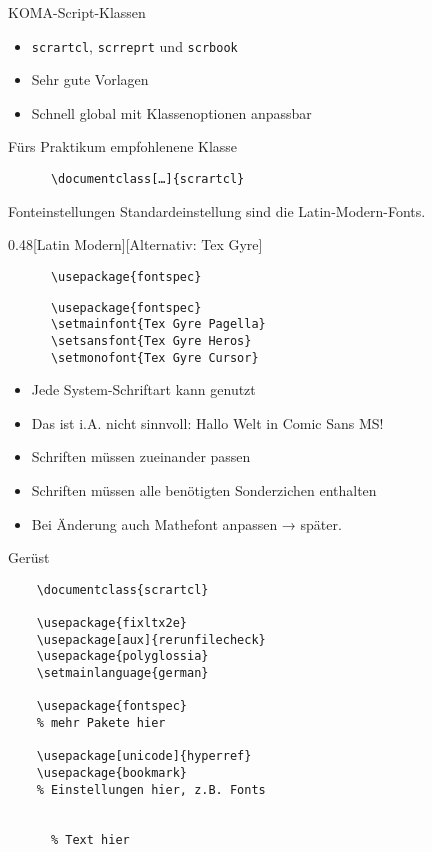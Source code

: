 \begin{frame}[fragile]{
  KOMA-Script-Klassen
  \hfill{}
}
  \begin{itemize}
    \item \texttt{scrartcl}, \texttt{scrreprt} und \texttt{scrbook}
    \item Sehr gute Vorlagen
    \item Schnell global mit Klassenoptionen anpassbar
  \end{itemize}
  \begin{block}{Fürs Praktikum empfohlenene Klasse}
    \begin{lstlisting}
      \documentclass[…]{scrartcl}
    \end{lstlisting}
  \end{block}
\end{frame}

\begin{frame}[fragile]{Fonteinstellungen}
  Standardeinstellung sind die Latin-Modern-Fonts.
  \vspace{1em}
  \begin{CodeExplanation}{0.48}[Latin Modern][Alternativ: Tex Gyre]
    \begin{lstlisting}
      \usepackage{fontspec}
    \end{lstlisting}
  \Explanation
    \begin{lstlisting}
      \usepackage{fontspec}
      \setmainfont{Tex Gyre Pagella}
      \setsansfont{Tex Gyre Heros}
      \setmonofont{Tex Gyre Cursor}
    \end{lstlisting}
  \end{CodeExplanation}
  \begin{itemize}
    \item Jede System-Schriftart kann genutzt
    \item \alert{Das ist i.A. nicht sinnvoll:  Hallo Welt in Comic Sans MS!}
    \item Schriften müssen zueinander passen
    \item Schriften müssen alle benötigten Sonderzichen enthalten
    \item Bei Änderung auch Mathefont anpassen → später.
  \end{itemize}
\end{frame}

\begin{frame}[fragile]{Gerüst}
  \begin{lstlisting}
    \documentclass{scrartcl}

    \usepackage{fixltx2e}
    \usepackage[aux]{rerunfilecheck}
    \usepackage{polyglossia}
    \setmainlanguage{german}

    \usepackage{fontspec}
    % mehr Pakete hier

    \usepackage[unicode]{hyperref}
    \usepackage{bookmark}
    % Einstellungen hier, z.B. Fonts

    
      % Text hier
    
  \end{lstlisting}
\end{frame}

